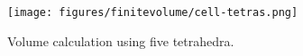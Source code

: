 \begin{figure}[ht]
    \centering
    \texttt{[image: figures/finitevolume/cell-tetras.png]}
    \caption{Volume calculation using five tetrahedra.}
    \label{fig:finitevolume-cell-tetras}
\end{figure}
